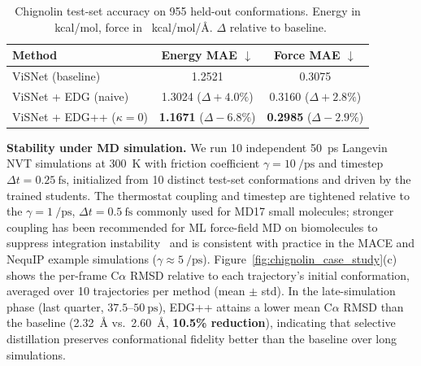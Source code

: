 \begin{table}[!t]
  \scriptsize
  \centering
  \caption{Chignolin test-set accuracy on 955 held-out conformations. Energy in \SI{}{kcal/mol}, force in \SI{}{kcal/mol/\angstrom}. $\Delta$ relative to baseline.}
  \label{tab:chignolin_energy_force}
  \begin{tabular}{lcc}
    \toprule
    \textbf{Method} & \textbf{Energy MAE} $\downarrow$ & \textbf{Force MAE} $\downarrow$ \\
    \midrule
    ViSNet (baseline)  & 1.2521 & 0.3075 \\
    ViSNet + EDG (naive)   & 1.3024 ($\Delta\!+\!4.0\%$) & 0.3160 ($\Delta\!+\!2.8\%$) \\
    ViSNet + EDG++ ($\kappa{=}0$) & \textbf{1.1671} ($\Delta\!-\!6.8\%$) & \textbf{0.2985} ($\Delta\!-\!2.9\%$) \\
    \bottomrule
  \end{tabular}
\end{table}

\textbf{Stability under MD simulation.} We run 10 independent \SI{50}{\pico\second} Langevin NVT simulations at \SI{300}{\kelvin} with friction coefficient $\gamma\!=\!\SI{10}{\per\pico\second}$ and timestep $\Delta t\!=\!\SI{0.25}{\femto\second}$, initialized from 10 distinct test-set conformations and driven by the trained students. The thermostat coupling and timestep are tightened relative to the $\gamma\!=\!\SI{1}{\per\pico\second}$, $\Delta t\!=\!\SI{0.5}{\femto\second}$ commonly used for MD17 small molecules; stronger coupling has been recommended for ML force-field MD on biomolecules to suppress integration instability~\cite{bizzi2025stability,fu2023forces} and is consistent with practice in the MACE and NequIP example simulations ($\gamma\!\approx\!\SI{5}{\per\pico\second}$). Figure~\ref{fig:chignolin_case_study}(c) shows the per-frame C$\alpha$ RMSD relative to each trajectory's initial conformation, averaged over 10 trajectories per method (mean $\pm$ std). In the late-simulation phase (last quarter, $37.5$--$\SI{50}{\pico\second}$), EDG++ attains a lower mean C$\alpha$ RMSD than the baseline (\SI{2.32}{\angstrom} vs.\ \SI{2.60}{\angstrom}, \textbf{10.5\% reduction}), indicating that selective distillation preserves conformational fidelity better than the baseline over long simulations.

